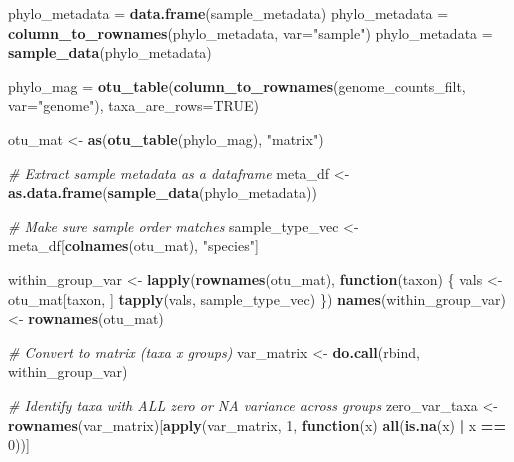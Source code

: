 \documentclass[
]{book}
\newenvironment{Shaded}{\begin{snugshade}}{\end{snugshade}}
\newcommand{\AttributeTok}[1]{\textcolor[rgb]{0.13,0.29,0.53}{#1}}
\newcommand{\CommentTok}[1]{\textcolor[rgb]{0.56,0.35,0.01}{\textit{#1}}}
\newcommand{\ConstantTok}[1]{\textcolor[rgb]{0.56,0.35,0.01}{#1}}
\newcommand{\ControlFlowTok}[1]{\textcolor[rgb]{0.13,0.29,0.53}{\textbf{#1}}}
\newcommand{\DecValTok}[1]{\textcolor[rgb]{0.00,0.00,0.81}{#1}}
\newcommand{\FunctionTok}[1]{\textcolor[rgb]{0.13,0.29,0.53}{\textbf{#1}}}
\newcommand{\NormalTok}[1]{#1}
\newcommand{\OtherTok}[1]{\textcolor[rgb]{0.56,0.35,0.01}{#1}}
\newcommand{\SpecialCharTok}[1]{\textcolor[rgb]{0.81,0.36,0.00}{\textbf{#1}}}
\newcommand{\StringTok}[1]{\textcolor[rgb]{0.31,0.60,0.02}{#1}}
\begin{document}
\begin{Shaded}
\begin{Highlighting}[]
\NormalTok{phylo\_metadata }\OtherTok{=} \FunctionTok{data.frame}\NormalTok{(sample\_metadata)}
\NormalTok{phylo\_metadata }\OtherTok{=} \FunctionTok{column\_to\_rownames}\NormalTok{(phylo\_metadata, }\AttributeTok{var=}\StringTok{"sample"}\NormalTok{)}
\NormalTok{phylo\_metadata }\OtherTok{=} \FunctionTok{sample\_data}\NormalTok{(phylo\_metadata)}

\NormalTok{phylo\_mag }\OtherTok{=} \FunctionTok{otu\_table}\NormalTok{(}\FunctionTok{column\_to\_rownames}\NormalTok{(genome\_counts\_filt, }\AttributeTok{var=}\StringTok{"genome"}\NormalTok{), }\AttributeTok{taxa\_are\_rows=}\ConstantTok{TRUE}\NormalTok{)}

\NormalTok{otu\_mat }\OtherTok{\textless{}{-}} \FunctionTok{as}\NormalTok{(}\FunctionTok{otu\_table}\NormalTok{(phylo\_mag), }\StringTok{"matrix"}\NormalTok{)}

\CommentTok{\# Extract sample metadata as a dataframe}
\NormalTok{meta\_df }\OtherTok{\textless{}{-}} \FunctionTok{as.data.frame}\NormalTok{(}\FunctionTok{sample\_data}\NormalTok{(phylo\_metadata))}

\CommentTok{\# Make sure sample order matches}
\NormalTok{sample\_type\_vec }\OtherTok{\textless{}{-}}\NormalTok{ meta\_df[}\FunctionTok{colnames}\NormalTok{(otu\_mat), }\StringTok{"species"}\NormalTok{]}

\NormalTok{within\_group\_var }\OtherTok{\textless{}{-}} \FunctionTok{lapply}\NormalTok{(}\FunctionTok{rownames}\NormalTok{(otu\_mat), }\ControlFlowTok{function}\NormalTok{(taxon) \{}
\NormalTok{  vals }\OtherTok{\textless{}{-}}\NormalTok{ otu\_mat[taxon, ]}
  \FunctionTok{tapply}\NormalTok{(vals, sample\_type\_vec)}
\NormalTok{\})}
\FunctionTok{names}\NormalTok{(within\_group\_var) }\OtherTok{\textless{}{-}} \FunctionTok{rownames}\NormalTok{(otu\_mat)}

\CommentTok{\# Convert to matrix (taxa x groups)}
\NormalTok{var\_matrix }\OtherTok{\textless{}{-}} \FunctionTok{do.call}\NormalTok{(rbind, within\_group\_var)}

\CommentTok{\# Identify taxa with ALL zero or NA variance across groups}
\NormalTok{zero\_var\_taxa }\OtherTok{\textless{}{-}} \FunctionTok{rownames}\NormalTok{(var\_matrix)[}\FunctionTok{apply}\NormalTok{(var\_matrix, }\DecValTok{1}\NormalTok{, }\ControlFlowTok{function}\NormalTok{(x) }\FunctionTok{all}\NormalTok{(}\FunctionTok{is.na}\NormalTok{(x) }\SpecialCharTok{|}\NormalTok{ x }\SpecialCharTok{==} \DecValTok{0}\NormalTok{))]}


\end{Highlighting}
\end{Shaded}
\end{document}
